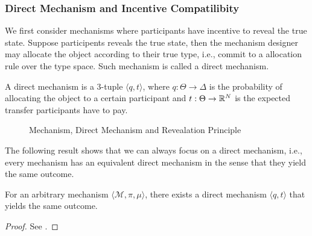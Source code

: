 \subsubsection{Direct Mechanism and Incentive Compatilibity}
We first consider mechanisms where participants have incentive to reveal the true state. Suppose participents reveals the true state, then the mechanism designer may allocate the object according to their true type, i.e., commit to a allocation rule 
over the type space. Such mechanism is called a direct mechanism.
\begin{definition}
    A direct mechanism is a 3-tuple $\langle q,t \rangle$, where $q:\Theta\to \Delta$ is the probability of allocating the object to a certain participant and $t:\Theta\to \mathbb{R}^N$ is the expected transfer participants have to pay.
\end{definition} 
\begin{figure}[h]
    \centering
\caption{Mechanism, Direct Mechanism and Revealation Principle}
\label{MDMandRP}
\end{figure}

The following result shows that we can always focus on a direct mechanism, i.e., every mechanism has an equivalent direct mechanism in the sense that they yield the same outcome.
\begin{theorem}
    For an arbitrary mechanism $\langle \mathcal{M}, \pi, \mu \rangle$, there exists a direct mechanism $\langle q,t \rangle$ that yields the same outcome.
\end{theorem}
\begin{proof}
    See .
\end{proof}

